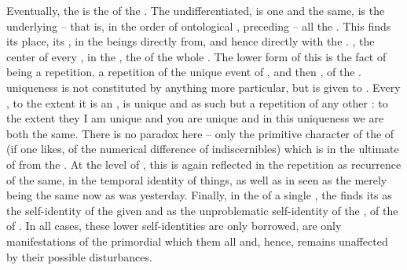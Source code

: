 \pa Eventually, the  is the  of the .  The
undifferentiated,  is one and the same, is the 
underlying -- that is, in the order of ontological , preceding --
all the .  This  finds its  place, its
, in the beings  directly from, and hence
 directly with the .  , the  center
of every ,  in the ,  the
 of the whole . The lower form of this  is the
fact of  being a repetition, a repetition of the unique event of
, and then , of the . 
uniqueness is not constituted by anything more particular, 
but is given to . Every ,
to the extent it is an , is unique and as such but a repetition of
any other : to the extent they   I am unique and you are unique and in this uniqueness
we are both the same.  There is no paradox here -- only the primitive character
of the  of  (if one likes, of the numerical difference of
indiscernibles) which is  in the ultimate  of
 from the .  At the level of , this is again
reflected in the repetition as recurrence of the same, in the temporal identity
of  things, as well as in  seen as the merely 
being the same now as  was yesterday.  Finally, in the  of a
single , the  finds its  as the self-identity
of the  given  and as the unproblematic self-identity
of the , of the  of . In all cases,
these lower self-identities are only borrowed, are only 
manifestations of the primordial  which  them all and, 
hence, remains unaffected by their possible disturbances. 


